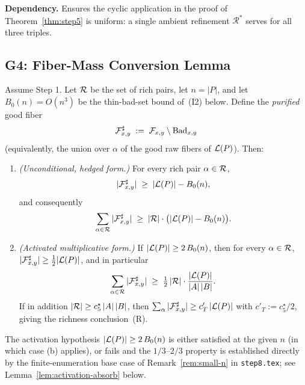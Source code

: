 \noindent\textbf{Dependency.} Ensures the cyclic application in the
proof of Theorem~\ref{thm:step5} is uniform: a single ambient
refinement $\mathcal R^*$ serves for all three triples.

\subsection{G4: Fiber-Mass Conversion Lemma}\label{subsec:G4}

\begin{lemma}\label{lem:fiber-mass}
Assume Step 1. Let $\mathcal{R}$ be the set of rich pairs, let $n = |P|$, and
let $B_0(n) = O(n^3)$ be the thin-bad-set bound of~(I2) below. Define
the \emph{purified} good fiber
\[
\mathcal{F}_{x,y}^{\sharp} \;:=\; \mathcal{F}_{x,y} \setminus \mathrm{Bad}_{x,y}
\]
(equivalently, the union over $\alpha$ of the good raw fibers of
$\mathcal{L}(P)$). Then:
\begin{enumerate}[label=(\alph*),nosep,leftmargin=*]
  \item \emph{(Unconditional, hedged form.)} For every rich pair
    $\alpha \in \mathcal{R}$,
    \[
    |\mathcal{F}_{x,y}^{\sharp}| \;\ge\; |\mathcal{L}(P)| - B_0(n),
    \]
    and consequently
    \[
    \sum_{\alpha \in \mathcal{R}} |\mathcal{F}_{x,y}^{\sharp}|
    \;\ge\; |\mathcal{R}|\cdot\bigl(|\mathcal{L}(P)| - B_0(n)\bigr).
    \]
  \item \emph{(Activated multiplicative form.)} If $|\mathcal{L}(P)| \ge
    2\,B_0(n)$, then for every $\alpha \in \mathcal{R}$,
    $|\mathcal{F}_{x,y}^{\sharp}| \ge \tfrac12|\mathcal{L}(P)|$, and in particular
    \[
    \sum_{\alpha \in \mathcal{R}} |\mathcal{F}_{x,y}^{\sharp}|
    \;\ge\; \tfrac{1}{2}\,|\mathcal{R}|\cdot \frac{|\mathcal{L}(P)|}{|A|\,|B|}.
    \]
    If in addition $|\mathcal{R}| \ge c_5^\star\,|A|\,|B|$, then
    $\sum_{\alpha} |\mathcal{F}_{x,y}^{\sharp}| \ge c'_T\,|\mathcal{L}(P)|$ with
    $c'_T := c_5^\star/2$, giving the richness conclusion~(R).
\end{enumerate}
The activation hypothesis $|\mathcal{L}(P)| \ge 2\,B_0(n)$ is either satisfied
at the given $n$ (in which case (b) applies), or fails and the
$1/3$--$2/3$ property is established directly by the
finite-enumeration base case of
Remark~\ref{rem:small-n} in \texttt{step8.tex}; see
Lemma~\ref{lem:activation-absorb} below.
\end{lemma}

